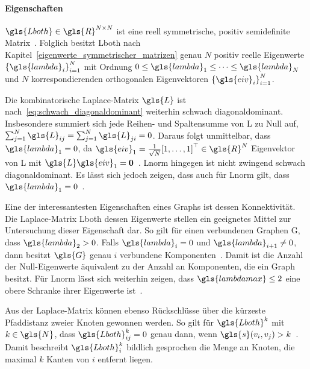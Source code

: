 \paragraph{Eigenschaften}
\label{laplace_eigenschaften}

$\gls{Lboth} \in \gls{R}^{N \times N}$ ist eine reell symmetrische, positiv semidefinite Matrix~\cite{Chung}.
Folglich besitzt \gls{Lboth} nach Kapitel~\ref{eigenwerte_symmetrischer_matrizen} genau $N$ positiv reelle Eigenwerte ${\left\{\gls{lambda}_i\right\}}_{i=1}^N$ mit Ordnung $0 \leq \gls{lambda}_1 \leq \cdots \leq \gls{lambda}_N$ und $N$ korrespondierenden orthogonalen Eigenvektoren ${\left\{\gls{eiv}_i\right\}}_{i=1}^N$.

Die kombinatorische Laplace-Matrix $\gls{L}$ ist nach~\eqref{eq:schwach_diagonaldominant} weiterhin schwach diagonaldominant.
Insbesondere summiert sich jede Reihen- und Spaltensumme von \gls{L} zu Null auf, \dhe{} $\sum_{j=1}^N \gls{L}_{ij} = \sum_{j=1}^N \gls{L}_{ji} = 0$.
Daraus folgt unmittelbar, dass $\gls{lambda}_1 = 0$, da $\gls{eiv}_1 = \frac{1}{\sqrt{N}}{\left[1, \ldots, 1\right]}^{\top} \in \gls{R}^N$ Eigenvektor von \gls{L} mit $\gls{L}\gls{eiv}_1 = \ve{0}$~\cite{Shuman}.
\gls{Lnorm} hingegen ist nicht zwingend schwach diagonaldominant.
Es lässt sich jedoch zeigen, dass auch für \gls{Lnorm} gilt, dass $\gls{lambda}_1 = 0$~\cite{Chung}.

Eine der interessantesten Eigenschaften eines Graphs ist dessen Konnektivität.
Die Laplace-Matrix \gls{Lboth} \bzw{} dessen Eigenwerte stellen ein geeignetes Mittel zur Untersuchung dieser Eigenschaft dar.
So gilt \zB{} für einen verbundenen Graphen \gls{G}, dass $\gls{lambda}_2 > 0$.
Falls $\gls{lambda}_i = 0$ und $\gls{lambda}_{i+1} \neq 0$, dann besitzt $\gls{G}$ genau $i$ verbundene Komponenten~\cite{Chung}.
Damit ist die Anzahl der Null-Eigenwerte äquivalent zu der Anzahl an Komponenten, die ein Graph besitzt.
Für \gls{Lnorm} lässt sich weiterhin zeigen, dass $\gls{lambdamax} \leq 2$ eine obere Schranke ihrer Eigenwerte ist~\cite{Chung}.

Aus der Laplace-Matrix können ebenso Rückschlüsse über die kürzeste Pfaddistanz zweier Knoten gewonnen werden.
So gilt für $\gls{Lboth}^{k}$ mit $k \in \gls{N}$, dass $\gls{Lboth}^k_{ij} = 0$ genau dann, wenn $\gls{s}\left(v_i, v_j\right) > k$~\cite{Hammond}.
Damit beschreibt $\gls{Lboth}^k_i$ bildlich gesprochen die Menge an Knoten, die maximal $k$ Kanten von $i$ entfernt liegen.
